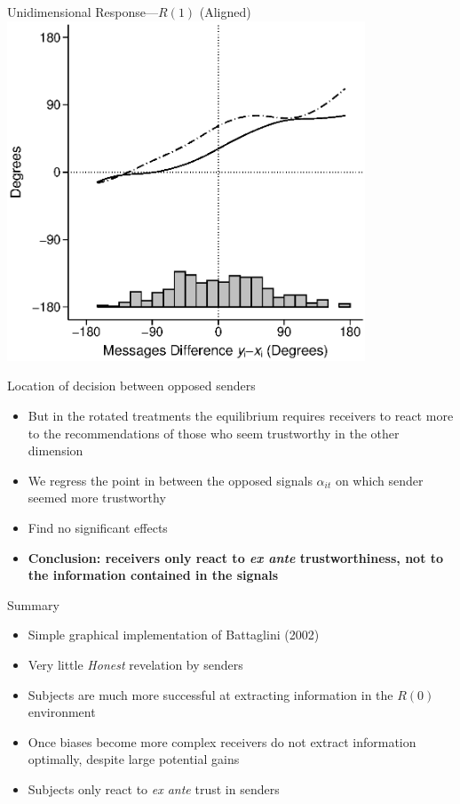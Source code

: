 \documentclass{beamer}
\begin{document}
\begin{frame}{Unidimensional Response---$R(1)$ (Aligned)}
	\centering \includegraphics[width=0.8\textwidth]{./i/ConditionalChoiceWHist_SR_2.eps}
\end{frame}

\begin{frame}{Location of decision between opposed senders}
	\begin{itemize}
		\item But in the rotated treatments the equilibrium requires receivers to react more to the recommendations of those who seem trustworthy in the other dimension
		\item We regress the point in between the opposed signals $\alpha_{it}$ on which sender seemed more trustworthy
		\item Find no significant effects \pause
		\item {\bf Conclusion: receivers only react to \emph{ex ante} trustworthiness, not to the information contained in the signals}
	\end{itemize}
\end{frame}

\begin{frame}{Summary}
	\begin{itemize}
		\item Simple graphical implementation of Battaglini (2002)
		\item Very little \emph{Honest} revelation by senders
		\item Subjects are much more successful at extracting information in the $R(0)$ environment
		\item Once biases become more complex receivers do not extract information optimally, despite large potential gains
		\item Subjects only react to \emph{ex ante} trust in senders
	\end{itemize}
\end{frame}
\end{document}

